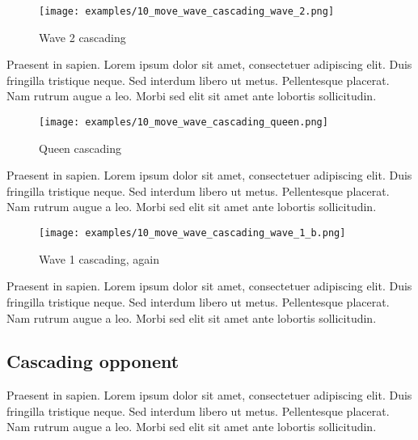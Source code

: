 \clearpage %

\noindent
\begin{wrapfigure}[10]{l}{0.5625\textwidth}
\texttt{[image: examples/10\_move\_wave\_cascading\_wave\_2.png]}
\caption{Wave 2 cascading}
\label{fig:10_move_wave_cascading_wave_2}
\end{wrapfigure}
Praesent in sapien. Lorem ipsum dolor sit amet, consectetuer adipiscing elit.
Duis fringilla tristique neque. Sed interdum libero ut metus. Pellentesque placerat.
Nam rutrum augue a leo. Morbi sed elit sit amet ante lobortis sollicitudin.

\vspace*{0.15\textheight}
\noindent
\begin{wrapfigure}[10]{r}{0.5625\textwidth}
\texttt{[image: examples/10\_move\_wave\_cascading\_queen.png]}
\caption{Queen cascading}
\label{fig:10_move_wave_cascading_queen}
\end{wrapfigure}
Praesent in sapien. Lorem ipsum dolor sit amet, consectetuer adipiscing elit.
Duis fringilla tristique neque. Sed interdum libero ut metus. Pellentesque placerat.
Nam rutrum augue a leo. Morbi sed elit sit amet ante lobortis sollicitudin.

\clearpage %

\noindent
\begin{wrapfigure}[10]{l}{0.5625\textwidth}
\texttt{[image: examples/10\_move\_wave\_cascading\_wave\_1\_b.png]}
\caption{Wave 1 cascading, again}
\label{fig:10_move_wave_cascading_wave_1_b}
\end{wrapfigure}
Praesent in sapien. Lorem ipsum dolor sit amet, consectetuer adipiscing elit.
Duis fringilla tristique neque. Sed interdum libero ut metus. Pellentesque placerat.
Nam rutrum augue a leo. Morbi sed elit sit amet ante lobortis sollicitudin.


\clearpage %

\subsection*{Cascading opponent}

Praesent in sapien. Lorem ipsum dolor sit amet, consectetuer adipiscing elit.
Duis fringilla tristique neque. Sed interdum libero ut metus. Pellentesque placerat.
Nam rutrum augue a leo. Morbi sed elit sit amet ante lobortis sollicitudin.

